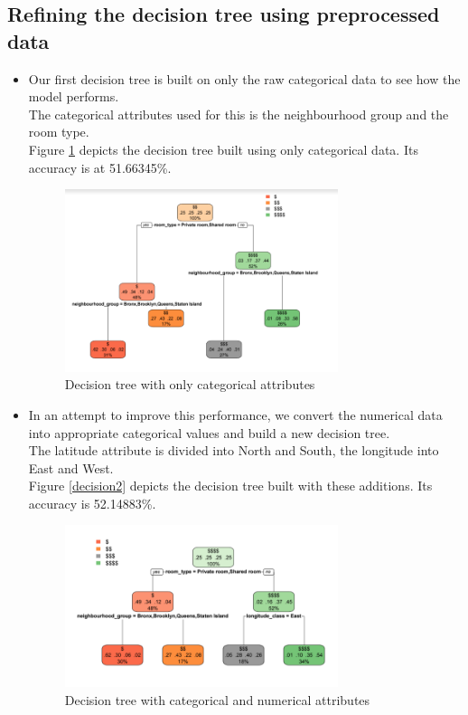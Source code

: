\documentclass{sig-alternate}
\begin{document}
	\subsection{Refining the decision tree using preprocessed data}
	\begin{itemize}
		\item Our first decision tree is built on only the raw categorical data to see how the model performs.\\
		The categorical attributes used for this is the neighbourhood group and the room type. \\
		Figure \ref{decision1} depicts the decision tree built using only categorical data. Its accuracy is at 51.66345\%.
		\begin{figure}[ht]
			\includegraphics[width=8cm]{decision1.PNG}
			\caption{Decision tree with only categorical attributes}
			\label{decision1}
			\centering
		\end{figure}
		\item In an attempt to improve this performance, we convert the numerical data into appropriate categorical values and build a new decision tree.\\
		The latitude attribute is divided into North and South, the longitude into East and West.\\
		Figure \ref{decision2} depicts the decision tree built with these additions. Its accuracy is 52.14883\%.
		\begin{figure}[ht]
			\includegraphics[width=8cm]{decision2.PNG}
			\caption{Decision tree with categorical and numerical attributes}

\end{figure}
\end{itemize}
\end{document}
